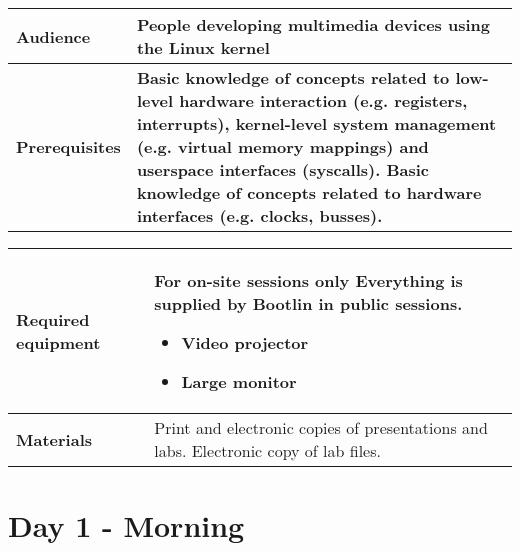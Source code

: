 \documentclass[a4paper,12pt,obeyspaces,spaces,hyphens]{article}
\begin{document}
{\begin{tabularx}{\textwidth}{|g|h|}
    {\bf Audience} & People developing multimedia devices using the Linux kernel\\
    \hline

    {\bf Prerequisites} &
    {\bf Basic knowledge of concepts related to low-level hardware interaction
    (e.g. registers, interrupts), kernel-level system management (e.g. virtual
    memory mappings) and userspace interfaces (syscalls).
    Basic knowledge of concepts related to hardware interfaces
    (e.g. clocks, busses).}\\
    \hline

  \end{tabularx}

  \begin{tabularx}{\textwidth}{|g|h|}
    {\bf Required equipment} &
    {\bf For on-site sessions only}
    \newline Everything is supplied by Bootlin in public sessions.
    \begin{itemize}
    \item Video projector
    \item Large monitor
    \end{itemize}\\
    \hline

    {\bf Materials} & Print and electronic copies of presentations and
    labs.
    \newline Electronic copy of lab files.\\
    \hline

\end{tabularx}}
\normalsize

\section{Day 1 - Morning}
\end{document}
